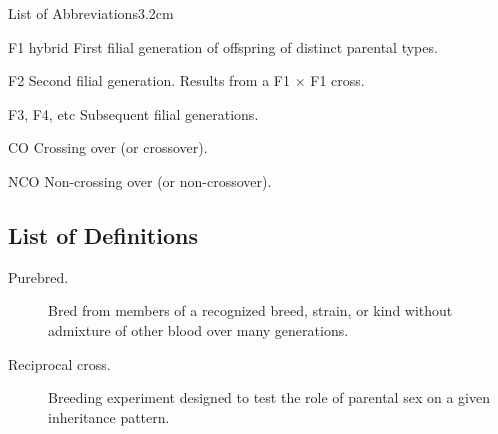 
\begin{mclistof}{List of Abbreviations}{3.2cm}

\item[F1 hybrid] First filial generation of offspring of distinct parental types.
\item[F2] Second filial generation. Results from a F1 $\times$ F1 cross.
\item[F3, F4, etc] Subsequent filial generations.


\item[CO] Crossing over (or crossover).
\item[NCO] Non-crossing over (or non-crossover).




\end{mclistof}




\begin{alwayssingle}\chapter*{List of Definitions}
	\thispagestyle{empty}
	\pagestyle{empty}
	\setlength{\baselineskip}{\frontmatterbaselineskip}
	\begin{description}

		\item[Purebred.] Bred from members of a recognized breed, strain, or kind without admixture of other blood over many generations.
		\item[Reciprocal cross.] Breeding experiment designed to test the role of parental sex on a given inheritance pattern.

	\end{description}
\end{alwayssingle}
\mtcaddchapter{}


